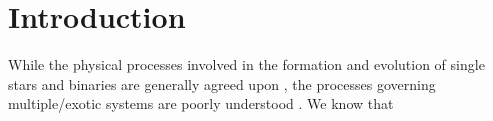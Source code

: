 \section{Introduction}
While the physical processes involved in the formation and evolution of single stars and binaries are generally agreed upon {\parencites[see][]{toonenPopCORNHuntingDifferences2014}{postnovEvolutionCompactBinary2014}}, the processes governing multiple/exotic systems are poorly understood {\parencite[see][]{toonenEvolutionHierarchicalTriple2016}}. We know that
